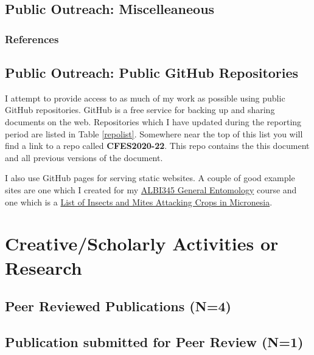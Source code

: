\subsection{Public Outreach: Miscelleaneous}
\begin{refsection}
\nocite{moore_what_2022}
\subsubsection{References}
\printbibliography[heading=none]
\end{refsection}

\subsection{Public Outreach: Public GitHub Repositories}

I attempt to provide access to as much of my work as possible using public GitHub repositories. GitHub is a free service for backing up and sharing documents on the web. Repositories which I have updated during the reporting period are listed in Table \ref{repolist}. Somewhere near the top of this list you will find a link to a repo called \textbf{CFES2020-22}. This repo contains the this document and all previous versions of the document.

I also use GitHub pages for serving static websites. A couple of good example sites are one which I created for my \href{https://aubreymoore.github.io/ALBI-345/}{ALBI345 General Entomology} course and one which is a \href{https://aubreymoore.github.io/crop-pest-list/}{List of Insects and Mites Attacking Crops in Micronesia}.



\section{Creative/Scholarly Activities or Research}

\subsection{Peer Reviewed Publications (N=4)}
	\begin{refsection}
		\nocite{siderhurst_effects_2021, barrera_electron_2021, marshall_production_2021, cave_biological_2022}
		\printbibliography[heading=none]
	\end{refsection}

\subsection{Publication submitted for Peer Review (N=1)}
\begin{refsection}
	\nocite{moore_detecting_2022}
	\printbibliography[heading=none]
\end{refsection}

